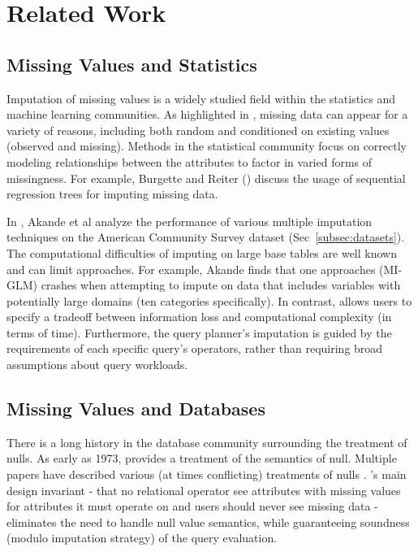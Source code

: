 \section{Related Work}

\subsection{Missing Values and Statistics}

Imputation of missing values is a widely studied field within the statistics and machine
learning communities. As highlighted in \cite{gelman2006data}, missing data
can appear for a variety of reasons, including both random and conditioned on
existing values (observed and missing). Methods in the statistical community
focus on correctly modeling relationships between the attributes to factor in
varied forms of missingness. For example, Burgette and Reiter
(\cite{burgette2010multiple}) discuss the usage of sequential regression trees
for imputing missing data.

In \cite{akande2015empirical}, Akande et al analyze the performance of various
multiple imputation techniques on the American Community Survey dataset
(Sec~\ref{subsec:datasets}). The computational difficulties of imputing on large base
tables are well known and can limit approaches. For example, Akande finds that
one approaches (MI-GLM) crashes when attempting to impute on data that
includes variables with potentially large domains (ten categories specifically).
In contrast, \ProjectName{} allows users to specify a tradeoff between
information loss and computational complexity (in terms of time). Furthermore,
the query planner's imputation is guided by the requirements of each specific
query's operators, rather than requiring broad assumptions about query
workloads.  

\subsection{Missing Values and Databases}
There is a long history in the database community surrounding the
treatment of nulls. As early as 1973, \cite{codd1973understanding}
provides a treatment of the semantics of null. Multiple
papers have described various (at times conflicting) treatments
of nulls \cite{grant1977null}. \ProjectName's main design invariant - that no relational operator
see attributes with missing values for attributes it must operate on and users should never see
missing data - eliminates
the need to handle null value semantics, while guaranteeing soundness (modulo
imputation strategy) of the query evaluation.

